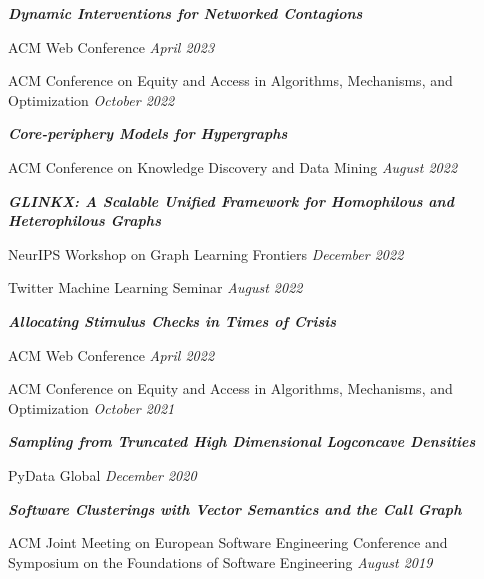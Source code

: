 \documentclass[margin]{res}
\newcommand{\bemph}[1]{\textbf{\emph{#1}}}
\begin{document}
\begin{resume}
\begin{compactitem}
	\item \bemph{Dynamic Interventions for Networked Contagions}
	\begin{compactitem}
		\item ACM Web Conference \hfill \emph{April 2023}	
		\item ACM Conference on Equity and Access in Algorithms, Mechanisms, and Optimization \hfill \emph{October 2022}
	\end{compactitem}

	\item \bemph{Core-periphery Models for Hypergraphs}
	\begin{compactitem}
		\item ACM Conference on Knowledge Discovery and Data Mining \hfill \emph{August 2022}
	\end{compactitem}
	
	\item \bemph{GLINKX: A Scalable Unified Framework for Homophilous and Hetero\-philous Graphs}
	\begin{compactitem}
		\item NeurIPS Workshop on Graph Learning Frontiers  \hfill \emph{December 2022}
		\item Twitter Machine Learning Seminar \hfill \emph{August 2022}
		
	\end{compactitem}

 
	\item \bemph{Allocating Stimulus Checks in Times of Crisis} 
	\begin{compactitem}
		\item ACM Web Conference \hfill \emph{April 2022}
		\item ACM Conference on Equity and Access in Algorithms, Mechanisms, and Optimization \hfill \emph{October 2021}
	\end{compactitem}

	\item \bemph{Sampling from Truncated High Dimensional Logconcave Densities}
	\begin{compactitem}
		\item PyData Global \hfill \emph{December 2020}
	\end{compactitem}
	
	\item \bemph{Software Clusterings with Vector Semantics and the Call Graph}
	\begin{compactitem}
		\item ACM Joint Meeting on European Software Engineering Conference and Symposium on the Foundations of Software Engineering \hfill \emph{August 2019}
	\end{compactitem} 
	

\end{compactitem}
\end{resume}
\end{document}
